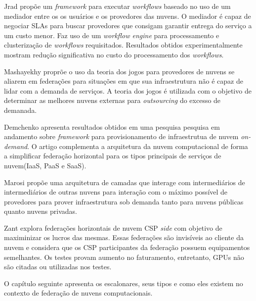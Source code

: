 Jrad\cite{Jrad:2013:BFM:2462326.2462339} propõe um \textit{framework} para executar \textit{workflows} baseado no uso de um mediador entre os os usuários e os provedores das nuvens. O mediador é capaz de negociar \acrshort{SLA}s para buscar provedores que consigam garantir entrega do serviço a um custo menor. Faz uso de um \textit{workflow engine} para processamento e clusterização de \textit{workflows} requisitados. Resultados obtidos experimentalmente mostram redução significativa no custo do processamento dos \textit{workflows}.

Mashayekhy\cite{6853386} proprõe o uso da teoria dos jogos para provedores de nuvens se aliarem em federações para situações em que sua infraestrutura não é capaz de lidar com a demanda de serviços. A teoria dos jogos é utilizada com o objetivo de determinar as melhores nuvens externas para \textit{outsourcing} do excesso de demanada.

Demchenko\cite{6427607} apresenta resultados obtidos em uma pesquisa pesquisa em andamento sobre \textit{framework} para provisionamento de infraestrutua de nuvem \textit{on-demand}. O artigo complementa a arquitetura da nuvem computacional de forma a simplificar federação horizontal para os tipos principais de serviços de nuvem(\acrshort{IaaS}, \acrshort{PaaS} e \acrshort{SaaS}).

Marosi\cite{FCM} propõe uma arquitetura de camadas que interage com intermediários de intermediários de outras nuvens para interação com o máximo possível de provedores para prover infraestrutura sob demanda tanto para nuvens públicas quanto nuvens privadas.

Zant\cite{6814036} explora federações horizontais de nuvem \acrfull{CSP} \textit{side} com objetivo de maximinizar os lucros das mesmas. Essas federações são invisíveis ao cliente da nuvem e considera que os \acrshort{CSP} participantes da federação possuem equipamentos semelhantes. Os testes provam aumento no faturamento, entretanto, \acrshort{GPU}s não são citadas ou utilizadas nos testes.



O capítulo seguinte apresenta os escalonares, seus tipos e como eles existem no contexto de federação de nuvens computacionais.

